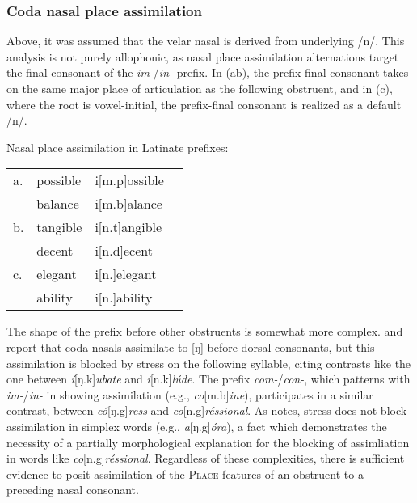\subsubsection{Coda nasal place assimilation}
\label{cnpasection}

Above, it was assumed that the velar nasal is derived from underlying /n/. 
This analysis is not purely allophonic, as nasal place assimilation alternations target the final consonant of the \emph{im-}/\emph{in-} prefix. In (\lastx ab), the prefix-final consonant takes on the same major place of articulation as the following obstruent, and in (\lastx c), where the root is vowel-initial, the prefix-final consonant is realized as a default /n/.

\ex Nasal place assimilation in Latinate prefixes: \\
\begin{tabular}{l l l l}
a. & possible & i[m.p]ossible \\
   & balance  & i[m.b]alance  \\
b. & tangible & i[n.t]angible \\
   & decent   & i[n.d]ecent   \\
c. & elegant  & i[n.]elegant  \\
   & ability  & i[n.]ability  \\
\end{tabular} 
\xe

\noindent
The shape of the prefix before other obstruents is somewhat more complex. 
\citet[][62]{Halle1985a} and \citet[][90]{Borowsky1986} report that coda nasals assimilate to [ŋ] before dorsal consonants, but this assimilation is blocked by stress on the following syllable, citing contrasts like the one between \emph{í}[ŋ.k]\emph{ubate} and \emph{i}[n.k]\emph{lúde}. The prefix \emph{com-}/\emph{con-}, which patterns with \emph{im-}/\emph{in-} in showing assimilation (e.g., \emph{co}[m.b]\emph{ine}), participates in a similar contrast, between \emph{có}[ŋ.g]\emph{ress} and \emph{co}[n.g]\emph{réssional}. As \citeauthor{Borowsky1986} notes, stress does not block assimilation in simplex words (e.g., \emph{a}[ŋ.g]\emph{óra}), a fact which demonstrates the necessity of a partially morphological explanation for the blocking of assimliation in words like \emph{co}[n.g]\emph{réssional}. Regardless of these complexities, there is sufficient evidence to posit assimilation of the \textsc{Place} features of an obstruent to a preceding nasal consonant. 

